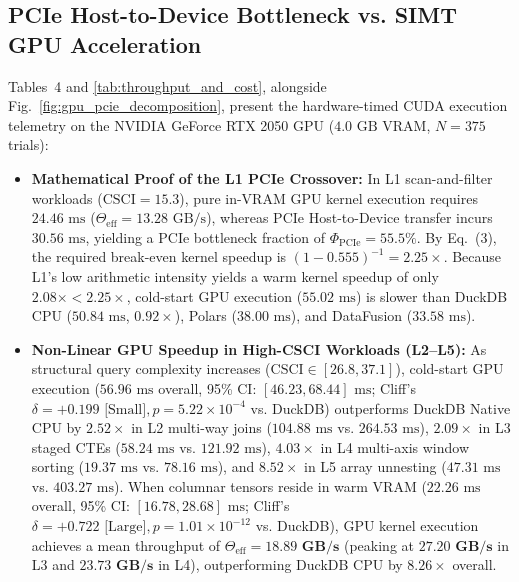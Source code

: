 \documentclass[10pt,a4paper]{article}
\begin{document}
\subsection{PCIe Host-to-Device Bottleneck vs. SIMT GPU Acceleration}
Tables~4 and \ref{tab:throughput_and_cost}, alongside Fig.~\ref{fig:gpu_pcie_decomposition}, present the hardware-timed CUDA execution telemetry on the NVIDIA GeForce RTX 2050 GPU ($4.0\text{ GB}$ VRAM, $N=375$ trials):
\begin{itemize}[leftmargin=1.5em,itemsep=2pt]
    \item \textbf{Mathematical Proof of the L1 PCIe Crossover:} In L1 scan-and-filter workloads ($\text{CSCI}=15.3$), pure in-VRAM GPU kernel execution requires $24.46\text{ ms}$ ($\Theta_{\text{eff}} = 13.28\text{ GB/s}$), whereas PCIe Host-to-Device transfer incurs $30.56\text{ ms}$, yielding a PCIe bottleneck fraction of $\Phi_{\text{PCIe}} = 55.5\%$. By Eq.~(3), the required break-even kernel speedup is $(1 - 0.555)^{-1} = \mathbf{2.25\times}$. Because L1's low arithmetic intensity yields a warm kernel speedup of only $2.08\times < 2.25\times$, cold-start GPU execution ($55.02\text{ ms}$) is slower than DuckDB CPU ($50.84\text{ ms}$, $0.92\times$), Polars ($38.00\text{ ms}$), and DataFusion ($33.58\text{ ms}$).
    \item \textbf{Non-Linear GPU Speedup in High-CSCI Workloads (L2--L5):} As structural query complexity increases ($\text{CSCI} \in [26.8, 37.1]$), cold-start GPU execution ($56.96\text{ ms}$ overall, 95\% CI: $[46.23, 68.44]\text{ ms}$; Cliff's $\delta = +0.199\text{ [Small]}, p = 5.22 \times 10^{-4}$ vs. DuckDB) outperforms DuckDB Native CPU by $\mathbf{2.52\times}$ in L2 multi-way joins ($104.88\text{ ms}$ vs. $264.53\text{ ms}$), $\mathbf{2.09\times}$ in L3 staged CTEs ($58.24\text{ ms}$ vs. $121.92\text{ ms}$), $\mathbf{4.03\times}$ in L4 multi-axis window sorting ($19.37\text{ ms}$ vs. $78.16\text{ ms}$), and $\mathbf{8.52\times}$ in L5 array unnesting ($47.31\text{ ms}$ vs. $403.27\text{ ms}$). When columnar tensors reside in warm VRAM ($22.26\text{ ms}$ overall, 95\% CI: $[16.78, 28.68]\text{ ms}$; Cliff's $\delta = +0.722\text{ [Large]}, p = 1.01 \times 10^{-12}$ vs. DuckDB), GPU kernel execution achieves a mean throughput of $\Theta_{\text{eff}} = \mathbf{18.89\text{ GB/s}}$ (peaking at $\mathbf{27.20\text{ GB/s}}$ in L3 and $\mathbf{23.73\text{ GB/s}}$ in L4), outperforming DuckDB CPU by $\mathbf{8.26\times}$ overall.
\end{itemize}
\end{document}
